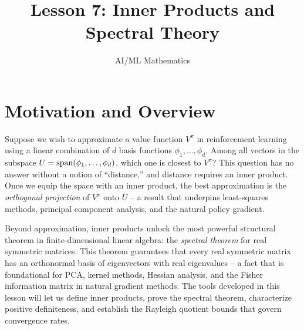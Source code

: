 \documentclass[11pt,a4paper]{article}
\title{Lesson 7: Inner Products and Spectral Theory}
\author{AI/ML Mathematics}
\date{}
\begin{document}
\maketitle
\tableofcontents
\newpage

\section{Motivation and Overview}
\label{sec:motivation}

Suppose we wish to approximate a value function $V^\pi$ in reinforcement
learning using a linear combination of $d$ basis functions
$\phi_1, \ldots, \phi_d$.  Among all vectors in the subspace
$U = \operatorname{span}(\phi_1, \ldots, \phi_d)$, which one is closest to $V^\pi$?
This question has no answer without a notion of ``distance,'' and distance
requires an inner product.  Once we equip the space with an inner product,
the best approximation is the \emph{orthogonal projection} of $V^\pi$ onto
$U$ -- a result that underpins least-squares methods, principal component
analysis, and the natural policy gradient.

Beyond approximation, inner products unlock the most powerful structural
theorem in finite-dimensional linear algebra: the \emph{spectral theorem}
for real symmetric matrices.  This theorem guarantees that every real
symmetric matrix has an orthonormal basis of eigenvectors with real
eigenvalues -- a fact that is foundational for PCA, kernel methods,
Hessian analysis, and the Fisher information matrix in natural gradient
methods.  The tools developed in this lesson will let us define inner
products, prove the spectral theorem, characterize positive definiteness,
and establish the Rayleigh quotient bounds that govern convergence rates.
\end{document}
